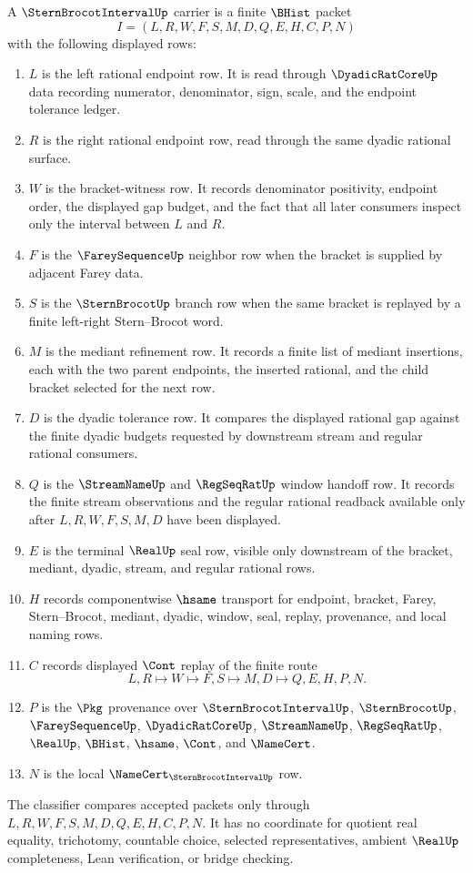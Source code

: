 \begin{definition}
\label{def:stern-brocot-interval-carrier}
A $\SternBrocotIntervalUp$ carrier is a finite $\BHist$ packet
$$
I=(L,R,W,F,S,M,D,Q,E,H,C,P,N)
$$
with the following displayed rows:
\begin{enumerate}
\item $L$ is the left rational endpoint row. It is read through $\DyadicRatCoreUp$ data recording numerator, denominator, sign, scale, and the endpoint tolerance ledger.
\item $R$ is the right rational endpoint row, read through the same dyadic rational surface.
\item $W$ is the bracket-witness row. It records denominator positivity, endpoint order, the displayed gap budget, and the fact that all later consumers inspect only the interval between $L$ and $R$.
\item $F$ is the $\FareySequenceUp$ neighbor row when the bracket is supplied by adjacent Farey data.
\item $S$ is the $\SternBrocotUp$ branch row when the same bracket is replayed by a finite left-right Stern--Brocot word.
\item $M$ is the mediant refinement row. It records a finite list of mediant insertions, each with the two parent endpoints, the inserted rational, and the child bracket selected for the next row.
\item $D$ is the dyadic tolerance row. It compares the displayed rational gap against the finite dyadic budgets requested by downstream stream and regular rational consumers.
\item $Q$ is the $\StreamNameUp$ and $\RegSeqRatUp$ window handoff row. It records the finite stream observations and the regular rational readback available only after $L,R,W,F,S,M,D$ have been displayed.
\item $E$ is the terminal $\RealUp$ seal row, visible only downstream of the bracket, mediant, dyadic, stream, and regular rational rows.
\item $H$ records componentwise $\hsame$ transport for endpoint, bracket, Farey, Stern--Brocot, mediant, dyadic, window, seal, replay, provenance, and local naming rows.
\item $C$ records displayed $\Cont$ replay of the finite route
$$
L,R \longmapsto W \longmapsto F,S \longmapsto M,D \longmapsto Q,E,H,P,N .
$$
\item $P$ is the $\Pkg$ provenance over $\SternBrocotIntervalUp$, $\SternBrocotUp$, $\FareySequenceUp$, $\DyadicRatCoreUp$, $\StreamNameUp$, $\RegSeqRatUp$, $\RealUp$, $\BHist$, $\hsame$, $\Cont$, and $\NameCert$.
\item $N$ is the local $\NameCert_{\SternBrocotIntervalUp}$ row.
\end{enumerate}
The classifier compares accepted packets only through $L,R,W,F,S,M,D,Q,E,H,C,P,N$. It has no coordinate for quotient real equality, trichotomy, countable choice, selected representatives, ambient $\RealUp$ completeness, Lean verification, or bridge checking.
\end{definition}

